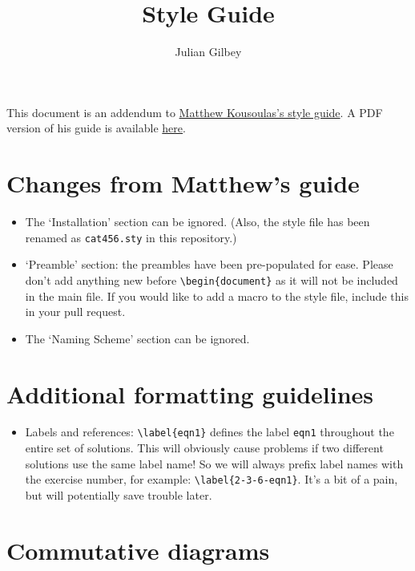 \documentclass{article}
\title{Style Guide}
\author{Julian Gilbey}
\begin{document}
\maketitle

This document is an addendum to
\href{https://github.com/madkous/math490/blob/master/style-guide/style-guide.tex}{Matthew
  Kousoulas's style guide}.  A PDF version of his guide is available
\href{https://github.com/juliangilbey/math490/blob/minor-latex-fixes/style-guide/style-guide.pdf}{here}.

\section*{Changes from Matthew's guide}

\begin{itemize}
\item The `Installation' section can be ignored.  (Also, the style
  file has been renamed as \verb+cat456.sty+ in this repository.)
\item `Preamble' section: the preambles have been pre-populated for
  ease.  Please don't add anything new before \verb+\begin{document}+
  as it will not be included in the main file.  If you would like to
  add a macro to the style file, include this in your pull request.
\item The `Naming Scheme' section can be ignored.
\end{itemize}

\section*{Additional formatting guidelines}

\begin{itemize}
\item Labels and references: \verb+\label{eqn1}+ defines the label
  \verb+eqn1+ throughout the entire set of solutions.  This will
  obviously cause problems if two different solutions use the same
  label name!  So we will always prefix label names with the exercise
  number, for example: \verb+\label{2-3-6-eqn1}+.  It's a bit of a
  pain, but will potentially save trouble later.
\end{itemize}

\section*{Commutative diagrams}
\end{document}

